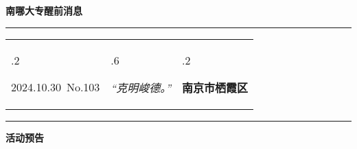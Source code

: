 \documentclass[letterpaper, 12pt]{article}
\begin{document}
\begin{center}
    \Huge\textbf{南哪大专醒前消息}
\end{center}
\vspace{4mm}
\hrule
\renewcommand\tabularxcolumn[1]{m{#1}}
\begin{tabularx}{\textwidth}{>{\hsize.2\hsize}X>{\hsize.6\hsize}X>{\hsize.2\hsize}X}
    \begin{flushleft}
        2024.10.30\, No.103
    \end{flushleft}
    &
    \begin{center}
        \textit{“克明峻德。”}
    \end{center}
    &
    \begin{flushright}
        \textbf{南京市栖霞区}
    \end{flushright}
\end{tabularx}
\vspace{-3.5mm}
\hrule
\vspace{4mm}
\centerline{\huge\textbf{活动预告}}
\end{document}

